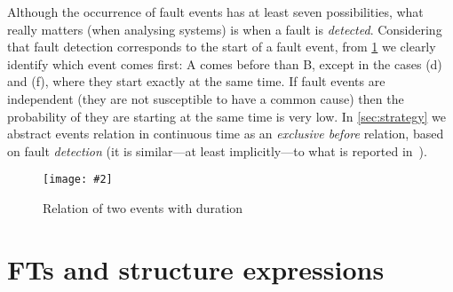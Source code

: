 \documentclass[en,twoside,onehalfspacing,phd]{risethesis}
\makeatletter
\newcommand{\todo}[1]{\@latex@warning{TODO #1}}
\newcommand{\includegraphicsaspectratio}[2][1]{%
  \texttt{[image: \#2]}%
}
\makeatother
\begin{document}
Although the occurrence of fault events has at least seven possibilities, what really matters (when analysing systems) is when a fault is \emph{detected}.
Considering that fault detection corresponds to the start of a fault event, from \cref{fig:time-relations} we clearly identify which event comes first: A comes before than B, except in the cases (d) and (f), where they start exactly at the same time.
If fault events are independent (they are not susceptible to have a common cause) then the probability of they are starting at the same time is very low.
In \cref{sec:strategy} we abstract events relation in continuous time as an \emph{exclusive before} relation, based on fault \emph{detection} (it is similar---at least implicitly---to what is reported in~\cite{WP2009,MRL2011}).


\begin{figure}[t]
  \centering
  \includegraphicsaspectratio[0.6]{time-relations}
  \caption{Relation of two events with duration}
  \label{fig:time-relations}
\end{figure}

\section{\Aclp{FT} and structure expressions}
\label{sec:structure-expressions}

\todo{Add fault trees}
\end{document}

